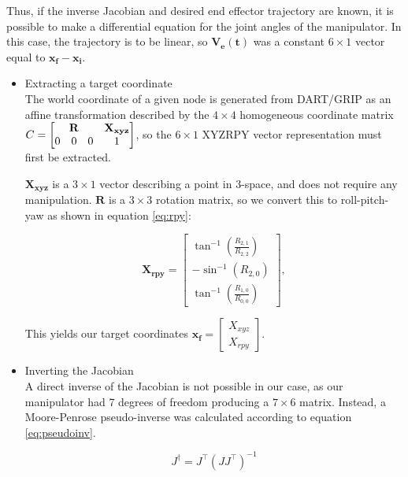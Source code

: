 \documentclass[10pt, conference]{IEEEtran}
\begin{document}
    Thus, if the inverse Jacobian and desired end effector trajectory
    are known, it is possible to make a differential equation for the
    joint angles of the manipulator. In this case, the trajectory is to
    be linear, so \(\mathbf{V_e(t)}\) was a constant \(6 \times 1\) vector equal
    to \(\mathbf{x_f}-\mathbf{x_i}\).
\begin{itemize}

\item Extracting a target coordinate\\
\label{sec-3-3-1-1}%
The world coordinate of a given node is generated from DART/GRIP as
     an affine transformation described by the \(4 \times 4\)
     homogeneous coordinate matrix \(C = \begin{bmatrix}
     \multicolumn{3}{c}{\mathbf{R}} & \mathbf{X_{xyz}} \\ 0 & 0 & 0 & 1 \end{bmatrix}\),
     so the \(6 \times 1\) XYZRPY vector representation must first be
     extracted.

     \(\mathbf{X_{xyz}}\) is a \(3 \times 1\) vector describing a point in
     3-space, and does not require any manipulation. \(\mathbf{R}\) is a \(3
     \times 3\) rotation matrix, so we convert this to roll-pitch-yaw as
     shown in equation \ref{eq:rpy}:

     \begin{equation}
     \label{eq:rpy}
     \mathbf{X_{rpy}} = \begin{bmatrix} \tan^{-1}(\frac{R_{2,1}}{R_{2,2}}) \\
     -\sin^{-1}(R_{2,0}) \\ \tan^{-1}(\frac{R_{1,0}}{R_{0,0}}) \end{bmatrix},
     \end{equation}

     This yields our target coordinates \(\mathbf{x_{f}}
     = \begin{bmatrix}X_{xyz} \\ X_{rpy} \end{bmatrix} \).


\item Inverting the Jacobian\\
\label{sec-3-3-1-2}%
A direct inverse of the Jacobian is not possible in our case, as
     our manipulator had 7 degrees of freedom producing a \(7 \times 6\)
     matrix. Instead, a Moore-Penrose pseudo-inverse was calculated
     according to equation \ref{eq:pseudoinv}.

     \begin{equation}
     \label{eq:pseudoinv}
     J^{\dagger} = J^{\top}(JJ^{\top})^{-1}
     \end{equation}


\end{itemize}
\end{document}
